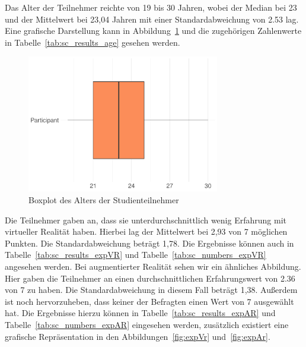 Das Alter der Teilnehmer reichte von 19 bis 30 Jahren, wobei der Median bei 23 und der Mittelwert bei 23,04 Jahren mit einer Standardabweichung von 2.53 lag. Eine grafische Darstellung kann in Abbildung~\ref{fig:age} und die zugehörigen Zahlenwerte in Tabelle~\ref{tab:sc_results_age} gesehen werden.

\begin{figure}[H]
	\centering
	\includegraphics[width=0.75\textwidth]{./_StudyResults/age}
	\caption{Boxplot des Alters der Studienteilnehmer}
	\label{fig:age}
\end{figure}

Die Teilnehmer gaben an, dass sie unterdurchschnittlich wenig Erfahrung mit virtueller Realität haben. Hierbei lag der Mittelwert bei 2,93 von 7 möglichen Punkten. Die Standardabweichung beträgt 1,78. Die Ergebnisse können auch in Tabelle~\ref{tab:sc_results_expVR} und Tabelle~\ref{tab:sc_numbers_expVR} angesehen werden. Bei augmentierter Realität sehen wir ein ähnliches Abbildung. Hier gaben die Teilnehmer an einen durchschnittlichen Erfahrungswert von 2.36 von 7 zu haben. Die Standardabweichung in diesem Fall beträgt 1,38. Außerdem ist noch hervorzuheben, dass keiner der Befragten einen Wert von 7 ausgewählt hat. Die Ergebnisse hierzu können in Tabelle~\ref{tab:sc_results_expAR} und Tabelle~\ref{tab:sc_numbers_expAR} eingesehen werden, zusätzlich existiert eine grafische Repräsentation in den Abbildungen~\ref{fig:expVr} und~\ref{fig:expAr}.


